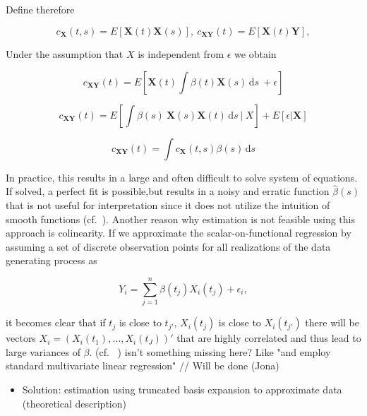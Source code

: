 \documentclass[11pt,twoside,a4paper]{article}
\begin{document}
    Define therefore
    
    \begin{equation}
  		c_{\mathbf{X}}(t,s) = E[\mathbf{X}(t)\mathbf{X}(s)],\: c_{\mathbf{X}\mathbf{Y}}(t) = E[\mathbf{X}(t)\mathbf{Y}], 
    \end{equation}

   Under the assumption that $X$ is independent from $\epsilon$ we obtain

   \begin{equation}
	   c_{\mathbf{X}\mathbf{Y}}(t) = E[\mathbf{X}(t)\int \beta(t)\mathbf{X}(s) \,\mathrm{d}s \ +\epsilon]
   \end{equation}

   \begin{equation}
 	  c_{\mathbf{X}\mathbf{Y}}(t) = E[\int \beta(s) \: \mathbf{X}(s)\mathbf{X}(t) \, \mathrm{d}s \: | \: X]  + E[\epsilon |\mathbf{X}]
   \end{equation}
  
   \begin{equation}
      c_{\mathbf{X}\mathbf{Y}}(t) = \int c_{\mathbf{X}}(t,s) \beta(s) \,\mathrm{d}s
   \end{equation}
   
   In practice, this results in a large and often difficult to solve system of equations. If solved, a  perfect fit is possible,but results in a noisy and erratic function $\hat{\beta}(s)$ that is not useful for interpretation since it does not utilize the intuition of smooth functions (cf.~\cite{horvath_inference_2012}). Another reason why estimation is not feasible using this approach is colinearity.
   If we approximate the scalar-on-functional regression by assuming a set of discrete observation points for all realizations of the data generating process as
   
  	\begin{equation}
    	Y_i = \sum_{j = 1}^{n} \beta(t_{j})X_i(t_{j}) + \epsilon_{i},
    \end{equation} 

	it becomes clear that if $t_{j}$ is close to $t_{j'}$, $X_{i}(t_{j})$ is close to $X_{i}(t_{j'})$ there will be vectors $X_{i} = (X_i(t_1), \dots, X_i(t_J))'$ that are highly correlated and thus lead to large variances of $\beta$. (cf. ~\cite{kokoszka_introduction_2017}) {\color{red} isn't something missing here? Like "and employ standard multivariate linear regression" // Will be done (Jona)}
  	
	\begin{itemize}
		\item Solution: estimation using truncated basis expansion to approximate data (theoretical description)
	\end{itemize}
		
\end{document}
